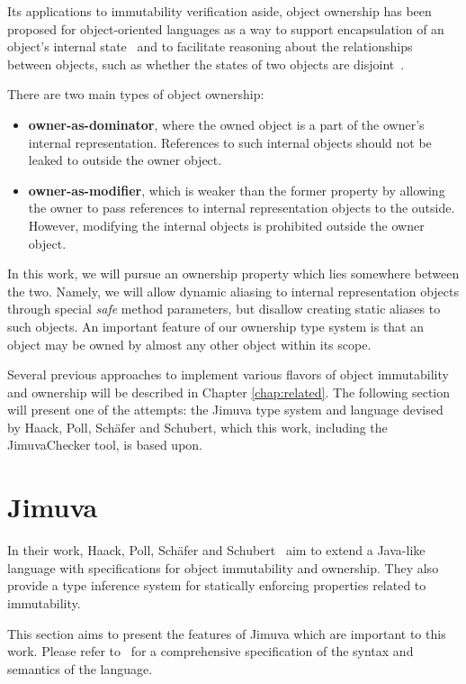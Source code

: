 \documentclass{pracamgr}
\theoremstyle{break}
\theoremstyle{break}
\theoremstyle{break}
\begin{document}
Its applications to immutability verification aside, object ownership
has been proposed for object-oriented languages as a way to support
encapsulation of an object's internal state~\cite{own-encap} and to
facilitate reasoning about the relationships between objects, such as
whether the states of two objects are disjoint~\cite{disjointness}.

There are two main types of object ownership:
\begin{itemize}
\item \textbf{owner-as-dominator}, where the owned object is a part of
  the owner's internal representation. References to such internal
  objects should not be leaked to outside the owner object. 
\item \textbf{owner-as-modifier}, which is weaker than the former
  property by allowing the owner to pass references to internal
  representation objects to the outside. However, modifying the
  internal objects is prohibited outside the owner object. 
\end{itemize}
In this work, we will pursue an ownership property which lies
somewhere between the two. Namely, we will allow dynamic aliasing to
internal representation objects through special \emph{safe} method
parameters, but disallow creating static aliases to such objects. An
important feature of our ownership type system is that an object may
be owned by almost any other object within its scope.

Several previous approaches to implement various flavors of object
immutability and ownership will be described in Chapter
\ref{chap:related}. The following section will present one of the
attempts: the Jimuva type system and language devised by Haack, Poll,
Schäfer and Schubert, which this work, including the JimuvaChecker
tool, is based upon.

\section{Jimuva}
\label{sec:jimuva}

In their work, Haack, Poll, Schäfer and Schubert~\cite{haack} aim to
extend a Java-like language with specifications for object
immutability and ownership. They also provide a type inference system
for statically enforcing properties related to immutability.

This section aims to present the features of Jimuva which are
important to this work. Please refer to~\cite{haack} for a
comprehensive specification of the syntax and semantics of the
language. 
\end{document}
